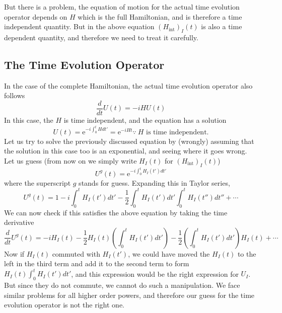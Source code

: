 \documentclass[11pt]{article}
\newcommand{\e}{\mathrm{e}}
\numberwithin{equation}{section}
\begin{document}
    But there is a problem, the equation of motion for the actual time evolution operator depends on \(H\) which is the full Hamiltonian, and is therefore a time independent quantity. But in the above equation \((H_{\text{int}})_I(t)\) is also a time dependent quantity, and therefore we need to treat it carefully.

    \subsection{The Time Evolution Operator}
    In the case of the complete Hamiltonian, the actual time evolution operator also follows
    \begin{equation*}
        \frac{d}{dt}U(t) = -iHU(t)
    \end{equation*}
    In this case, the \(H\) is time independent, and the equation has a solution 
    \begin{equation*}
        U(t) = \e^{-i\int_0^t Hdt'} = \e^{-iHt} \because ~H \text{ is time independent.}
    \end{equation*}
    Let us try to solve the previously discussed equation by (wrongly) assuming that the solution in this case too is an exponential, and seeing where it goes wrong. Let us guess (from now on we simply write \(H_I(t)\) for \((H_\text{int})_I(t)\))
    \begin{equation*}
        U^g(t) = \e^{-i\int_0^{t} H_I(t') dt'}
    \end{equation*} 
    where the superscript \(g\) stands for guess. Expanding this in Taylor series, 
    \begin{equation*}
        U^g(t) = 1 - i\int_0^t H_I(t') dt' - \frac{1}{2} \int_0^t H_I(t') dt' \int_0^t H_I(t'') dt'' + \cdots
    \end{equation*}
    We can now check if this satisfies the above equation by taking the time derivative
    \begin{equation*}
        \frac{d}{dt}U^g(t) = -iH_I(t) - \frac{1}{2} H_I(t) \left(\int_0^t H_I(t')dt'\right) - \frac{1}{2} \left(\int_0^t H_I(t') dt'\right) H_I(t) + \cdots
    \end{equation*}
    Now if \(H_I(t)\) commuted with \(H_I(t')\), we could have moved the \(H_I(t)\) to the left in the third term and add it to the second term to form \(H_I(t) \int_0^t H_I(t')dt'\), and this expression would be the right expression for \(U_I\). But since they do not commute, we cannot do such a manipulation. We face similar problems for all higher order powers, and therefore our guess for the time evolution operator is not the right one.\\
\end{document}

